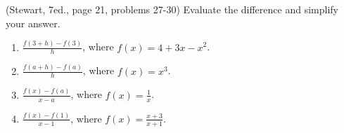 (Stewart, 7ed., page 21, problems 27-30)
Evaluate the difference and simplify your answer.
\begin{multicols}{2}
\begin{enumerate}
\item $\frac{f(3+h)-f(3)}{h}$, where $f(x)=4+3x-x^2$.
\item $\frac{f(a+h)-f(a)}{h}$, where $f(x)= x^3$.
\item $\frac{f(x)-f(a)}{x-a}$, where $f(x)=\frac{1}{x}$.
\item $\frac{f(x)-f(1)}{x-1}$, where $f(x)=\frac{x+3}{x+1}$.
\end{enumerate}
\end{multicols}
